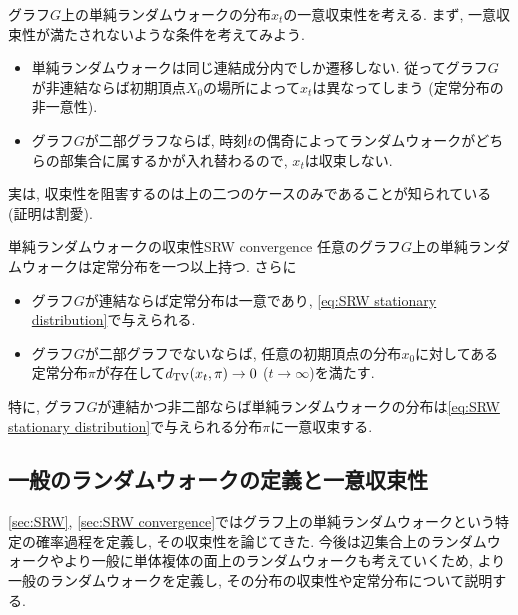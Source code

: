 グラフ$G$上の単純ランダムウォークの分布$x_t$の一意収束性を考える.
まず, 一意収束性が満たされないような条件を考えてみよう.
\begin{itemize}
  \item 単純ランダムウォークは同じ連結成分内でしか遷移しない. 従ってグラフ$G$が非連結ならば初期頂点$X_0$の場所によって$x_t$は異なってしまう (定常分布の非一意性).
  \item グラフ$G$が二部グラフならば, 時刻$t$の偶奇によってランダムウォークがどちらの部集合に属するかが入れ替わるので, $x_t$は収束しない.
\end{itemize}
%
実は, 収束性を阻害するのは上の二つのケースのみであることが知られている (証明は割愛).
%
\begin{theorem}{単純ランダムウォークの収束性}{SRW convergence}
  任意のグラフ$G$上の単純ランダムウォークは定常分布を一つ以上持つ.
  さらに
  \begin{itemize}
    \item グラフ$G$が連結ならば定常分布は一意であり, \cref{eq:SRW stationary distribution}で与えられる.
    \item グラフ$G$が二部グラフでないならば, 任意の初期頂点の分布$x_0$に対してある定常分布$\pi$が存在して$d_{\mathrm{TV}}(x_t,\pi)\to 0$ ($t\to\infty$)を満たす.
  \end{itemize}

  特に, グラフ$G$が連結かつ非二部ならば単純ランダムウォークの分布は\cref{eq:SRW stationary distribution}で与えられる分布$\pi$に一意収束する.
\end{theorem}


\subsection{一般のランダムウォークの定義と一意収束性} \label{sec:Markov chain}
  \cref{sec:SRW}, \ref{sec:SRW convergence}ではグラフ上の単純ランダムウォークという特定の確率過程を定義し, その収束性を論じてきた.
  今後は辺集合上のランダムウォークやより一般に単体複体の面上のランダムウォークも考えていくため,
  より一般のランダムウォークを定義し, その分布の収束性や定常分布について説明する.

